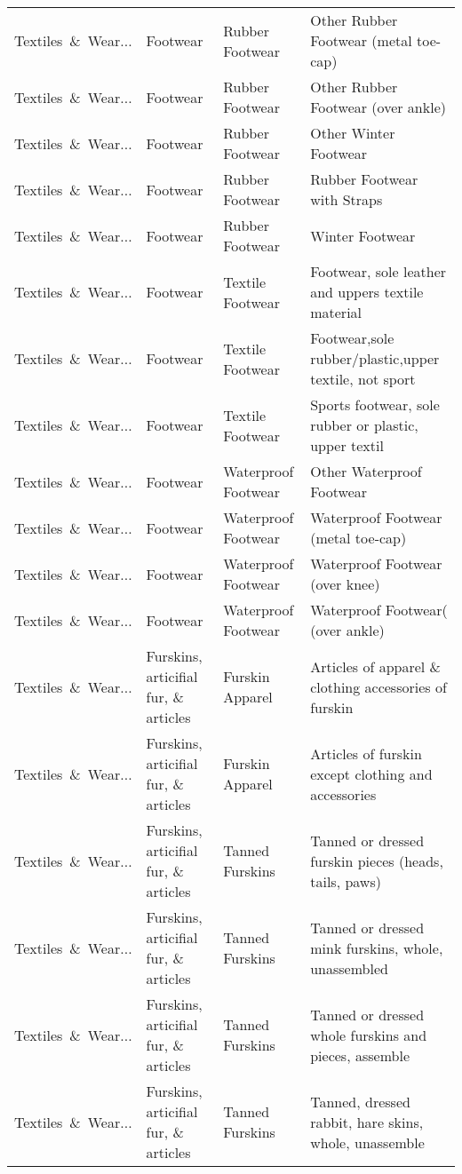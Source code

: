 \begin{appendices}
\begin{xltabular}{\textwidth}{|p{0.10\textwidth}|p{0.25\textwidth}|p{0.24\textwidth}|p{0.31\textwidth}|}
Textiles\ \&\ Wear... & Footwear & Rubber Footwear & Other Rubber Footwear (metal toe-cap) \\
Textiles\ \&\ Wear... & Footwear & Rubber Footwear & Other Rubber Footwear (over ankle) \\
Textiles\ \&\ Wear... & Footwear & Rubber Footwear & Other Winter Footwear \\
Textiles\ \&\ Wear... & Footwear & Rubber Footwear & Rubber Footwear with Straps \\
Textiles\ \&\ Wear... & Footwear & Rubber Footwear & Winter Footwear \\
Textiles\ \&\ Wear... & Footwear & Textile Footwear & Footwear, sole leather and uppers textile material \\
Textiles\ \&\ Wear... & Footwear & Textile Footwear & Footwear,sole rubber/plastic,upper textile, not sport \\
Textiles\ \&\ Wear... & Footwear & Textile Footwear & Sports footwear, sole rubber or plastic, upper textil \\
Textiles\ \&\ Wear... & Footwear & Waterproof Footwear & Other Waterproof Footwear \\
Textiles\ \&\ Wear... & Footwear & Waterproof Footwear & Waterproof Footwear (metal toe-cap) \\
Textiles\ \&\ Wear... & Footwear & Waterproof Footwear & Waterproof Footwear (over knee) \\
Textiles\ \&\ Wear... & Footwear & Waterproof Footwear & Waterproof Footwear( (over ankle) \\
Textiles\ \&\ Wear... & Furskins, articifial fur, \& articles & Furskin Apparel & Articles of apparel \& clothing accessories of furskin \\
Textiles\ \&\ Wear... & Furskins, articifial fur, \& articles & Furskin Apparel & Articles of furskin except clothing and accessories \\
Textiles\ \&\ Wear... & Furskins, articifial fur, \& articles & Tanned Furskins & Tanned or dressed furskin pieces (heads, tails, paws) \\
Textiles\ \&\ Wear... & Furskins, articifial fur, \& articles & Tanned Furskins & Tanned or dressed mink furskins, whole, unassembled \\
Textiles\ \&\ Wear... & Furskins, articifial fur, \& articles & Tanned Furskins & Tanned or dressed whole furskins and pieces, assemble \\
Textiles\ \&\ Wear... & Furskins, articifial fur, \& articles & Tanned Furskins & Tanned, dressed rabbit, hare skins, whole, unassemble \\

\end{xltabular}
\end{appendices}
